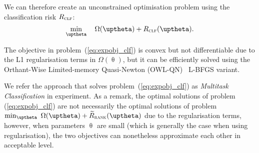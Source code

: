 We can therefore create an unconstrained optimisation problem using the classification risk $R_\textsc{clf}$:
\begin{equation}
\label{eq:expobj_clf}
\min_\uptheta \quad \Omega(\uptheta) + R_\textsc{clf}(\uptheta).
\end{equation}

The objective in problem~(\ref{eq:expobj_clf}) is convex but not differentiable due to the L1 regularisation terms in $\Omega(\uptheta)$,
but it can be efficiently solved using the Orthant-Wise Limited-memory Quasi-Newton (OWL-QN)~\cite{andrew2007scalable} L-BFGS variant.

We refer the approach that solves problem~(\ref{eq:expobj_clf}) as \emph{Multitask Classification} in experiment.
As a remark, the optimal solutions of problem (\ref{eq:expobj_clf}) are not necessarily the optimal solutions 
of problem $\min_\uptheta \ \Omega(\uptheta) + \widetilde R_\textsc{rank}(\uptheta)$ due to the regularisation terms,
however, when parameters $\uptheta$ are small (which is generally the case when using regularisation), the two objectives 
can nonetheless approximate each other in acceptable level.





%


